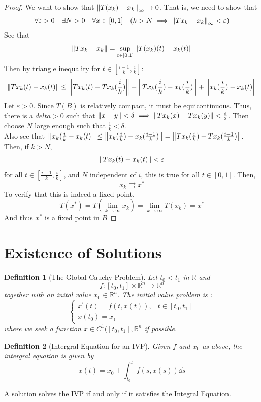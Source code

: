 \documentclass[a4paper, 12pt]{book}
\newtheorem{definition}{Definition}[chapter]
\begin{document}
\begin{proof}
	We want to show that \( \norm{T(x_k)-x_k}_\infty \rightarrow 0\). That is, we need to show that \[
		\forall \varepsilon>0 \quad \exists N>0 \quad \forall x \in [0,1] \quad (k>N \implies \norm{Tx_k-x_k}_\infty<\varepsilon )
	\]
	See that \[
		\norm{Tx_k-x_k} =\sup_{t\in[0,1]}\norm{T(x_k)(t)-x_k(t)}
	\]
	Then by triangle inequality for \( t\in[\frac{ i-1 }{ k } , \frac{ i }{ k } ] \):
	\[
		\norm{Tx_k(t)-x_k(t)} \leq \norm{Tx_k(t)-Tx_k(\frac{ i }{ k })} + \norm{Tx_k(\frac{ i }{ k })-x_k(\frac{ i }{ k } ) } +\norm{x_k(\frac{ i }{ k } )-x_k(t)}
	\]
	Let \( \varepsilon>0 \). Since \( T(B) \) is relatively compact, it must be equicontinuous. Thus, there is a \( delta>0 \) such that \( \norm{x-y} <\delta \implies \norm{Tx_k(x)-Tx_k(y)}<\frac{ \varepsilon }{ 2 }\). Then choose \( N\) large enough such that \( \frac{ 1 }{ k } <\delta \). \\
	Also see that \( ||x_k(\frac{ i }{ k }-x_k(t)||\leq \norm{x_k(\frac{ i }{ k } )-x_k(\frac{ i-1 }{ k } )}=\norm{Tx_k(\frac{ i }{ k } )- Tx_k(\frac{ i-1 }{ k } )} \).
	\\

	Then, if \( k>N \), \[
		\norm{Tx_k(t)-x_k(t)}<\varepsilon
	\]
	for all \( t\in [\frac{ i-1}{k } , \frac{ i }{ k } ] \), and \( N \) independent of \( i \), this is true for all \( t\in[0,1] \). Then, \[
		x_k \rightrightarrows x^*
	\]
	To verify that this is indeed a fixed point, \[
		T(x^*)=T(\lim_{k \to \infty } x_k)=\lim_{k \to \infty}T(x_k)= x^*
	\]
	And thus \( x^*\) is a fixed point in \( B \)

\end{proof}
\section{Existence of Solutions}
\begin{definition}
	[The Global Cauchy Problem]
	Let \( t_0<t_1 \) in \( \mathbb{R} \) and \[
		f:[t_0,t_1]\times \mathbb{R}^n \to \mathbb{R}^n
	\]
	together with an inital value \( x_0\in \mathbb{R}^n \). The initial value problem is :
	\[
		\begin{cases}
			x^\prime(t)=f(t,x(t)), & t\in[t_0,t_1] \\
			x(t_0)=x_)
		\end{cases}
	\]
	where we seek a function \( x\in C^1([t_0,t_1], \mathbb{R}^n \) if possible.
\end{definition}
\begin{definition}
	[Intergral Equation for an IVP]
	Given \( f \) and \( x_0 \) as above, the intergral equation is given by \[
		x(t)=x_0+\int_{t_0}^{t} f(s,x(s)) \dd s
	\]
\end{definition}
A solution solves the IVP if and only if it satisfies the Integral Equation.
\\
\end{document}
